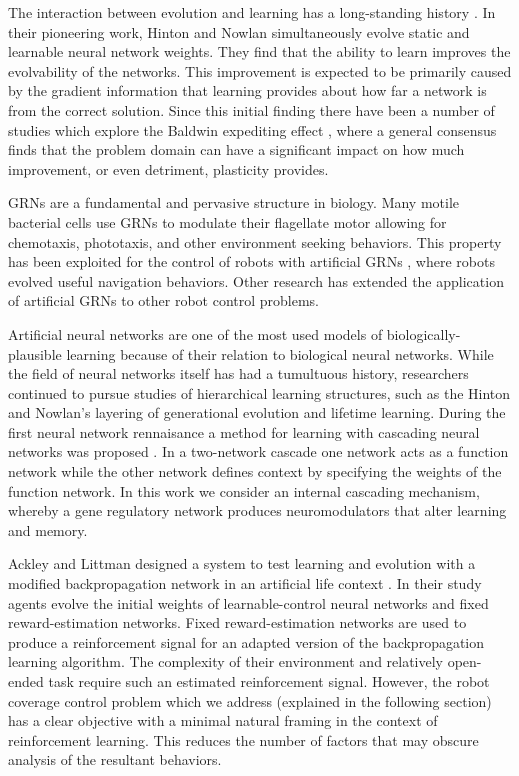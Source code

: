 \documentclass[conference]{IEEEtran}
\begin{document}
The interaction between evolution and learning has a long-standing history
\cite{hinton1987learning}. In their pioneering work, Hinton and Nowlan
simultaneously evolve static and learnable neural network weights. They find
that the ability to learn improves the evolvability of the networks. This
improvement is expected to be primarily caused by the gradient information that
learning provides about how far a network is from the correct solution.
Since this initial finding there have been a number of studies which explore the
Baldwin expediting effect \cite{Wagner1996, Ancel2000, Ancel2000a}, where a
general consensus finds that the problem domain can have a significant impact on
how much improvement, or even detriment, plasticity provides.

GRNs are a fundamental and pervasive structure in biology. Many motile bacterial
cells use GRNs to modulate their flagellate motor allowing for chemotaxis,
phototaxis, and other environment seeking behaviors. This property has been
exploited for the control of robots with artificial GRNs \cite{Ziegler:2001:AL,
Nicolau:2010:EuroGP, Joachimczak10, CussatBlanc2012b}, where robots evolved
useful navigation behaviors. Other research has extended the application of
artificial GRNs to other robot control problems.

Artificial neural networks are one of the most used models of
biologically-plausible learning because of their relation to biological neural
networks. While the field of neural networks itself has had a tumultuous
history, researchers continued to pursue studies of hierarchical learning
structures, such as the Hinton and Nowlan's layering of generational evolution
and lifetime learning. During the first neural network rennaisance a method
for learning with cascading neural networks was proposed \cite{Pollack1986}. In
a two-network cascade one network acts as a function network while the other
network defines context by specifying the weights of the function network. In
this work we consider an internal cascading mechanism, whereby a gene regulatory
network produces neuromodulators that alter learning and memory.

Ackley and Littman designed a system to test learning and evolution with a
modified backpropagation network in an artificial life context \cite{Ackley1991}. In
their study agents evolve the initial weights of learnable-control neural
networks and fixed reward-estimation networks. Fixed reward-estimation networks
are used to produce a reinforcement signal for an adapted version of the
backpropagation learning algorithm. The complexity of their environment and
relatively open-ended task require such an estimated reinforcement signal.
However, the robot coverage control problem which we address (explained in the
following section) has a clear objective with a minimal natural framing in the
context of reinforcement learning. This reduces the number
of factors that may obscure analysis of the resultant behaviors.
\end{document}

